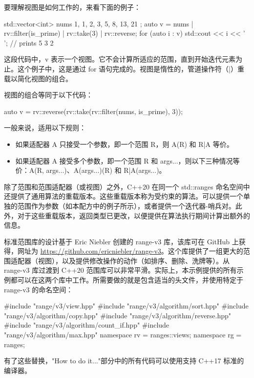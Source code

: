 要理解视图是如何工作的，来看下面的例子：

\begin{cpp}
std::vector<int> nums{ 1, 1, 2, 3, 5, 8, 13, 21 };
auto v = nums | rv::filter(is_prime) | rv::take(3) | rv::reverse;
for (auto i : v) std::cout << i << ' '; // prints 5 3 2
\end{cpp}

这段代码中，v 表示一个视图。它不会计算所适应的范围，直到开始迭代元素为止。这个例子中，这是通过 for 语句完成的。视图是惰性的，管道操作符（|）重载以简化视图的组合。

视图的组合等同于以下代码：

\begin{cpp}
auto v = rv::reverse(rv::take(rv::filter(nums, is_prime), 3));
\end{cpp}

一般来说，适用以下规则：

\begin{itemize}
\item
如果适配器 A 只接受一个参数，即一个范围 R，则 A(R) 和 R|A 等价。

\item
如果适配器 A 接受多个参数，即一个范围 R 和 args...，则以下三种情况等价：A(R, args...)、A(args...)(R) 和 R|A(args...)。
\end{itemize}

除了范围和范围适配器（或视图）之外，C++20 在同一个 std::ranges 命名空间中还提供了通用算法的重载版本。这些重载版本称为受约束的算法。可以提供一个单独的范围作为参数（如本配方中的例子所示），或者提供一个迭代器-哨兵对。此外，对于这些重载版本，返回类型已更改，以便提供在算法执行期间计算出额外的信息。


标准范围库的设计基于 Eric Niebler 创建的 range-v3 库，该库可在 GitHub 上获得，网址为 \url{https://github.com/ericniebler/range-v3}。这个库提供了一组更大的范围适配器（视图），以及提供修改操作的动作（如排序、删除、洗牌等）。从 range-v3 库过渡到 C++20 范围库可以非常平滑。实际上，本示例提供的所有示例都可以在这两个库中工作。所需要做的就是包含适当的头文件，并使用特定于 range-v3 的命名空间：

\begin{cpp}
#include "range/v3/view.hpp"
#include "range/v3/algorithm/sort.hpp"
#include "range/v3/algorithm/copy.hpp"
#include "range/v3/algorithm/reverse.hpp"
#include "range/v3/algorithm/count_if.hpp"
#include "range/v3/algorithm/max.hpp"
namespace rv = ranges::views;
namespace rg = ranges;
\end{cpp}

有了这些替换，"How to do it..."部分中的所有代码可以使用支持 C++17 标准的编译器。


